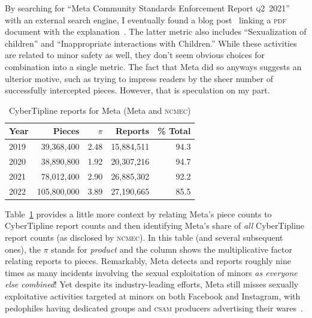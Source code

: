 \documentclass[nonacm,screen]{acmart}
\newcommand\V[1]{\textsc{\MakeLowercase{#1}}}
\begin{document}
By searching for ``Meta Community Standards Enforcement Report \V{\V{Q2}}~2021''
with an external search engine, I eventually found a blog
post~\cite{Facebook2021a} linking a \V{PDF} document with the
explanation~\cite{Facebook2021}. The latter metric also includes ``Sexualization
of children'' and ``Inappropriate interactions with Children.'' While these
activities are related to minor safety as well, they don't seem obvious choices
for combination into a single metric. The fact that Meta did so anyways suggests
an ulterior motive, such as trying to impress readers by the sheer number of
successfully intercepted pieces. However, that is speculation on my part.

\begin{table}[h!]
\centering\libertineLF
\caption{CyberTipline reports for Meta (Meta and \V{NCMEC})}
\label{tab:meta-pieces-and-reports}
\begin{tabular}{lrrrr}
\textbf{Year} & \textbf{Pieces} & $\pi$ & \textbf{Reports} & \textbf{\% Total} \\ \hline
2019 & 39,368,400 & 2.48 & 15,884,511 & 94.3 \\
2020 & 38,890,800 & 1.92 & 20,307,216 & 94.7 \\
2021 & 78,012,400 & 2.90 & 26,885,302 & 92.2 \\
2022 & 105,800,000 & 3.89 & 27,190,665 & 85.5 \\
\end{tabular}
\end{table}

Table~\ref{tab:meta-pieces-and-reports} provides a little more context by
relating Meta's piece counts to CyberTipline report counts and then identifying
Meta's share of \emph{all} CyberTipline report counts (as disclosed by
\V{NCMEC}). In this table (and several subsequent ones), the $\pi$ stands for
\emph{product} and the column shows the multiplicative factor relating reports
to pieces. Remarkably, Meta detects and reports roughly nine times as many
incidents involving the sexual exploitation of minors \emph{as everyone else
combined}! Yet despite its industry-leading efforts, Meta still misses sexually
exploitative activities targeted at minors on both Facebook and Instagram, with
pedophiles having dedicated groups and \V{CSAM} producers advertising their
wares~\cite{HorwitzBlunt2023,HorwitzBlunt2023a}.
\end{document}
